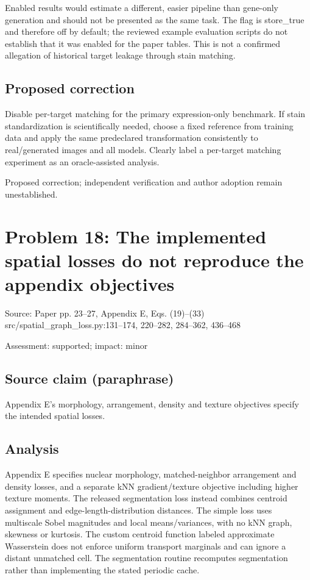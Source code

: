 \documentclass[11pt]{article}
\begin{document}
Enabled results would estimate a different, easier pipeline than gene-only generation and should not be presented as the same task. The flag is store\_true and therefore off by default; the reviewed example evaluation scripts do not establish that it was enabled for the paper tables. This is not a confirmed allegation of historical target leakage through stain matching.

\subsection*{Proposed correction}

Disable per-target matching for the primary expression-only benchmark. If stain standardization is scientifically needed, choose a fixed reference from training data and apply the same predeclared transformation consistently to real/generated images and all models. Clearly label a per-target matching experiment as an oracle-assisted analysis.

Proposed correction; independent verification and author adoption remain unestablished.

\section*{Problem 18: The implemented spatial losses do not reproduce the appendix objectives}

Source: Paper pp. 23–27, Appendix E, Eqs. (19)–(33) src/spatial\_graph\_loss.py:131–174, 220–282, 284–362, 436–468

Assessment: supported; impact: minor

\subsection*{Source claim (paraphrase)}

Appendix E's morphology, arrangement, density and texture objectives specify the intended spatial losses.

\subsection*{Analysis}

Appendix E specifies nuclear morphology, matched-neighbor arrangement and density losses, and a separate kNN gradient/texture objective including higher texture moments. The released segmentation loss instead combines centroid assignment and edge-length-distribution distances. The simple loss uses multiscale Sobel magnitudes and local means/variances, with no kNN graph, skewness or kurtosis. The custom centroid function labeled approximate Wasserstein does not enforce uniform transport marginals and can ignore a distant unmatched cell. The segmentation routine recomputes segmentation rather than implementing the stated periodic cache.
\end{document}
